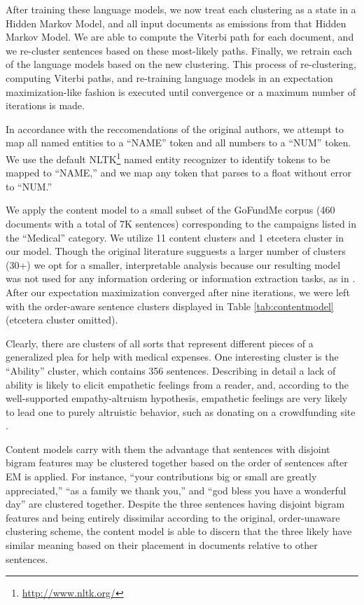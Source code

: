 \documentclass[letterpaper]{article}
\begin{document}
After training these language models, we now treat each clustering as a state in a Hidden Markov Model, and all input documents as emissions from that Hidden Markov Model. We are able to compute the Viterbi path for each document, and we re-cluster sentences based on these most-likely paths. Finally, we retrain each of the language models based on the new clustering. This process of re-clustering, computing Viterbi paths, and re-training language models in an expectation 
maximization-like fashion is executed until convergence or a maximum number of iterations is made. 

In accordance with the reccomendations of the original authors, we attempt to map all named entities to a ``NAME'' token and all numbers to a ``NUM'' token. We use the default NLTK\footnote{\url{http://www.nltk.org/}} named entity recognizer to identify tokens to be mapped to ``NAME,'' and we map any token that parses to a float without error to ``NUM.''

We apply the content model to a small subset of the GoFundMe corpus (460 documents with a total of 7K sentences) corresponding to the campaigns listed in the ``Medical'' category. We utilize 11 content clusters and 1 etcetera cluster in our model. Though the original literature sugguests a larger number of clusters (30+) we opt for a smaller, interpretable analysis because our resulting model was not used for any information ordering or information extraction tasks, as in \cite{barzilay2004catching}. After our expectation maximization converged after nine iterations, we were left with the order-aware sentence clusters displayed in Table \ref{tab:contentmodel} (etcetera cluster omitted).

Clearly, there are clusters of all sorts that represent different pieces of a generalized plea for help with medical expenses. One interesting cluster is the ``Ability'' cluster, which contains 356 sentences. Describing in detail a lack of ability is likely to elicit empathetic feelings from a reader, and, according to the well-supported empathy-altruism hypothesis, empathetic feelings are very likely to lead one to purely altruistic behavior, such as donating on a crowdfunding site \cite{batson1988five}.

Content models carry with them the advantage that sentences with disjoint bigram features may be clustered together based on the order of sentences after EM is applied. For instance, ``your contributions big or small are greatly appreciated,'' ``as a family we thank you,'' and ``god bless you have a wonderful day'' are clustered together. Despite the three sentences having disjoint bigram features and being entirely dissimilar according to the original, order-unaware clustering scheme, the content model is able to discern that the three likely have similar meaning based on their placement in documents relative to other sentences.
\end{document}
